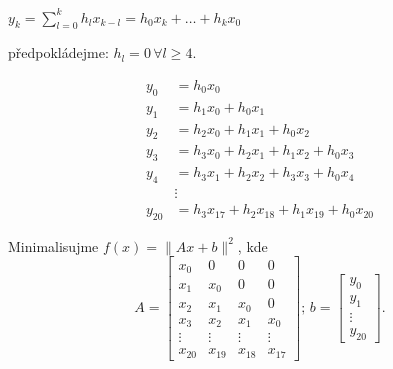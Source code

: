 \begin{multicols}{2}

    $y_k = \sum_{l=0}^k h_l x_{k-l} = h_0 x_k + \dots + h_k x_0$

    předpokládejme: $h_l = 0 \, \forall l \geq 4$. 
\columnbreak

    \begin{align*}
        y_0 &= h_0 x_0 \\
        y_1 &= h_1 x_0 + h_0 x_1 \\
        y_2 &= h_2 x_0 + h_1 x_1 + h_0 x_2 \\
        y_3 &= h_3 x_0 + h_2 x_1 + h_1 x_2 + h_0 x_3 \\
        y_4 &= h_3 x_1 + h_2 x_2 + h_3 x_3 + h_0 x_4 \\
        & \vdots \\
        y_{20} &= h_3 x_{17} + h_2 x_{18} + h_1 x_{19} + h_0 x_{20}
    \end{align*}
\end{multicols}
Minimalisujme $f(x) = \| Ax + b\|^2$, kde
\[
    A = 
    \begin{bmatrix}
        x_0 & 0 & 0 & 0 \\
        x_1 & x_0 & 0 & 0 \\
        x_2 & x_1 & x_0 & 0 \\
        x_3 & x_2 & x_1 & x_0 \\
        \vdots & \vdots & \vdots & \vdots \\
        x_{20} & x_{19} & x_{18} & x_{17}
    \end{bmatrix}\text{; } b = 
    \begin{bmatrix}
        y_0 \\
        y_1 \\
        \vdots \\
        y_{20}
    \end{bmatrix}.
\]
